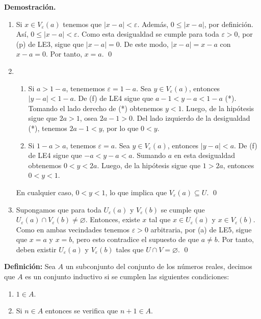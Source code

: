 \documentclass[11pt]{article}
\let\epsilon\varepsilon
\let\emptyset\varnothing
\begin{document}
\textbf{Demostración.}

\begin{enumerate}[label=\alph*)]
    \item Si $x\in V_\varepsilon(a)$ tenemos que $|x-a|<\varepsilon$. Además, $0\leq |x-a|$, por definición. Así, $0\leq |x-a|<\varepsilon$. Como esta desigualdad se cumple para toda $\varepsilon>0$, por (p) de LE3, sigue que $|x-a|=0$. De este modo, $|x-a|=x-a$ con $x-a=0$. Por tanto, $x=a$. \qed
    
    \item \begin{enumerate}[label=\roman*)]
        \item Si $a>1-a$, tenememos $\varepsilon=1-a$. Sea $y\in V_\varepsilon(a)$, entonces $|y-a|<1-a$. De (f) de LE4 sigue que $a-1<y-a<1-a$ (*). Tomando el lado derecho de (*) obtenemos $y<1$. Luego, de la hipótesis sigue que $2a>1$, osea $2a-1>0$. Del lado izquierdo de la desigualdad (*), tenemos $2a-1<y$, por lo que $0<y$.
        \item Si $1-a>a$, tenemos $\varepsilon=a$. Sea $y\in V_\varepsilon(a)$, entonces $|y-a|<a$. De (f) de LE4 sigue que $-a<y-a<a$. Sumando $a$ en esta desigualdad obtenemos $0<y<2a$. Luego, de la hipótesis sigue que $1>2a$, entonces $0<y<1$.\end{enumerate}
        En cualquier caso, $0<y<1$, lo que implica que $V_\varepsilon(a) \subseteq U$.
        \qed

    \item Supongamos que para toda $U_\varepsilon(a)$ y $V_\varepsilon(b)$ se cumple que $U_\varepsilon(a) \cap V_\varepsilon(b) \neq \emptyset$. Entonces, existe $x$ tal que $x\in U_\varepsilon(a)$ y $x\in V_\varepsilon(b)$. Como en ambas vecindades tenemos $\epsilon>0$ arbitraria, por (a) de LE5, sigue que $x=a$ y $x=b$, pero esto contradice el supuesto de que $a\neq b$. Por tanto, deben existir $U_\varepsilon(a)$ y $V_\varepsilon(b)$ tales que $U\cap V =\emptyset$. \qed
    \end{enumerate}

\textbf{Definición:} Sea $A$ un subconjunto del conjunto de los números reales, decimos que $A$ es un conjunto inductivo si se cumplen las siguientes condiciones:
    \begin{enumerate}
        \item $1 \in A$.
        \item Si $n \in A$ entonces se verifica que $n+1 \in A$.
    \end{enumerate}
\end{document}
